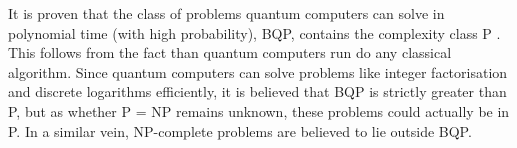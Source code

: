 It is proven that the class of problems quantum computers can solve in polynomial time (with high probability), BQP, contains the complexity class P \autocite{nielsen2012}.
This follows from the fact than quantum computers run do any classical algorithm.
Since quantum computers can solve problems like integer factorisation and discrete logarithms efficiently, it is believed that BQP is strictly greater than P, but as whether P = NP remains unknown, these problems could actually be in P.
In a similar vein, NP-complete problems are believed to lie outside BQP.